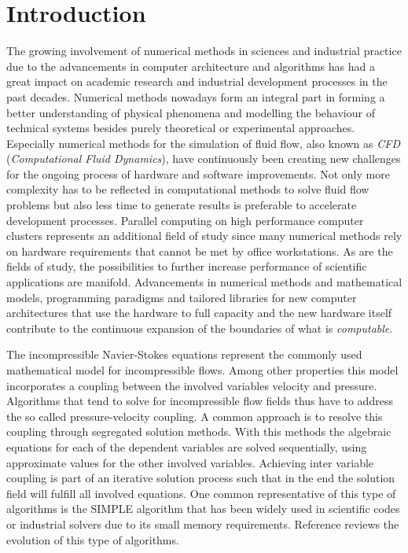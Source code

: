 \section{Introduction}

The growing involvement of numerical methods in sciences and industrial practice due to the advancements in computer architecture and algorithms has had a great impact on academic research and industrial development processes in the past decades. Numerical methods nowadays form an integral part in forming a better understanding of physical phenomena and modelling the behaviour of technical systems besides purely theoretical or experimental approaches. Especially numerical methods for the simulation of fluid flow, also known as \emph{CFD} (\emph{Computational Fluid Dynamics}), have continuously been creating new challenges for the ongoing process of hardware and software improvements. Not only more complexity has to be reflected in computational methods to solve fluid flow problems but also less time to generate results is preferable to accelerate development processes. Parallel computing on high performance computer clusters represents an additional field of study since many numerical methods rely on hardware requirements that cannot be met by office workstations. As are the fields of study, the possibilities to further increase performance of scientific applications are manifold. Advancements in numerical methods and mathematical models, programming paradigms and tailored libraries for new computer architectures that use the hardware to full capacity and the new hardware itself contribute to the continuous expansion of the boundaries of what is \emph{computable}.

The incompressible Navier-Stokes equations represent the commonly used mathematical model for incompressible flows. Among other properties this model incorporates a coupling between the involved variables velocity and pressure. Algorithms that tend to solve for incompressible flow fields thus have to address the so called pressure-velocity coupling. A common approach is to resolve this coupling through segregated solution methods. With this methods the algebraic equations for each of the dependent variables are solved sequentially, using approximate values for the other involved variables. Achieving inter variable coupling is part of an iterative solution process such that in the end the solution field will fulfill all involved equations. One common representative of this type of algorithms is the SIMPLE algorithm that has been widely used in scientific codes or industrial solvers due to its small memory requirements. Reference \cite{acharya07} reviews the evolution of this type of algorithms.

